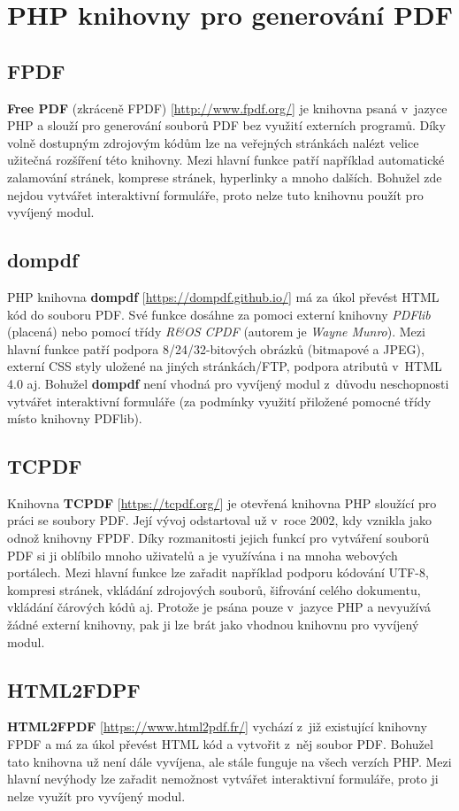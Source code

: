\section{PHP knihovny pro generování PDF}
\subsection{FPDF}
\textbf{Free PDF} (zkráceně FPDF) [\url{http://www.fpdf.org/}] je knihovna psaná v~jazyce PHP a slouží pro generování souborů PDF bez využití externích programů. Díky volně dostupným zdrojovým kódům lze na veřejných stránkách nalézt velice užitečná rozšíření této knihovny. Mezi hlavní funkce patří například automatické zalamování stránek, komprese stránek, hyperlinky a mnoho dalších. Bohužel zde nejdou vytvářet interaktivní formuláře, proto nelze tuto knihovnu použít pro vyvíjený modul.
\subsection{dompdf}
PHP knihovna \textbf{dompdf} [\url{https://dompdf.github.io/}] má za úkol převést HTML kód do souboru PDF. Své funkce dosáhne za pomoci externí knihovny \textit{PDFlib} (placená) nebo pomocí třídy \textit{R\&OS CPDF} (autorem je \textit{Wayne Munro}). Mezi hlavní funkce patří podpora 8/24/32-bitových obrázků (bitmapové a JPEG), externí CSS styly uložené na jiných stránkách/FTP, podpora atributů v~HTML 4.0 aj. Bohužel \textbf{dompdf} není vhodná pro vyvíjený modul z~důvodu neschopnosti vytvářet interaktivní formuláře (za podmínky využití přiložené pomocné třídy místo knihovny PDFlib).
\subsection{TCPDF} \label{subsec:tcpdf}
Knihovna \textbf{TCPDF} [\url{https://tcpdf.org/}] je otevřená knihovna PHP sloužící pro práci se soubory PDF. Její vývoj odstartoval už v~roce 2002, kdy vznikla jako odnož knihovny FPDF. Díky rozmanitosti jejich funkcí pro vytváření souborů PDF si ji oblíbilo mnoho uživatelů a je využívána i na mnoha webových portálech. Mezi hlavní funkce lze zařadit například podporu kódování UTF-8, kompresi stránek, vkládání zdrojových souborů, šifrování celého dokumentu, vkládání čárových kódů  aj. Protože je psána pouze v~jazyce PHP a nevyužívá žádné externí knihovny, pak ji lze brát jako vhodnou knihovnu pro vyvíjený modul.
\subsection{HTML2FDPF}
\textbf{HTML2FPDF} [\url{https://www.html2pdf.fr/}] vychází z~již existující knihovny FPDF a má za úkol převést HTML kód a vytvořit z~něj soubor PDF. Bohužel tato knihovna už není dále vyvíjena, ale stále funguje na všech verzích PHP. Mezi hlavní nevýhody lze zařadit nemožnost vytvářet interaktivní formuláře, proto ji nelze využít pro vyvíjený modul.
